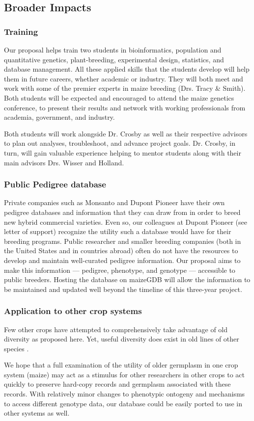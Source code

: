 \documentclass[12pt]{article}
\begin{document}
\subsection*{Broader Impacts}

\subsubsection*{Training}
Our proposal helps train two students in bioinformatics, population and quantitative genetics, plant-breeding, experimental design, statistics, and database management. 
All these applied skills that the students develop will help them in future careers, whether academic or industry. 
They will both meet and work with some of the premier experts in maize breeding (Drs. Tracy \& Smith). 
Both students will be expected and encouraged to attend the maize genetics conference, to present their results and network with working professionals from academia, government, and industry.

Both students will work alongside Dr. Crosby as well as their respective advisors to plan out analyses, troubleshoot, and advance project goals. 
Dr. Crosby, in turn, will gain valuable experience helping to mentor students along with their main advisors Drs. Wisser and Holland. 

\subsubsection*{Public Pedigree database}
Private companies such as Monsanto and Dupont Pioneer have their own pedigree databases and information that they can draw from in order to breed new hybrid commercial varieties. 
Even so, our colleagues at Dupont Pioneer (see letter of support) recognize the utility such a database would have for their breeding programs.
Public researcher and smaller breeding companies  (both in the United States and in countries abroad) often do not have the resources to develop and maintain well-curated pedigree information. 
Our proposal aims to make this information --- pedigree, phenotype, and genotype --- accessible to public breeders.
Hosting the database on maizeGDB will allow the information to be maintained and updated well beyond the timeline of this three-year project.

\subsubsection*{Application to other crop systems}
Few other crops have attempted to comprehensively take advantage of old diversity as proposed here.  
Yet, useful diversity does exist in old lines of other species \citep{gamuyao2012protein}. 

We hope that a full examination of the utility of older germplasm in one crop system (maize) may act as a stimulus for other researchers in other crops to act quickly to preserve hard-copy records and germplasm associated with these records. 
With relatively minor changes to phenotypic ontogeny and mechanisms to access different genotype data, our database could be easily ported to use in other systems as well. 

\newpage

\end{document}
